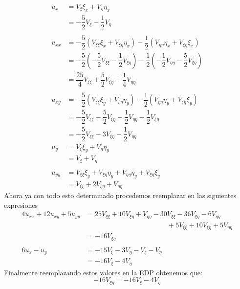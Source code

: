 \begin{homeworkProblem}
\begin{itemize}
\begin{solucion}
\begin{align*}
                 u_x&=V_\xi \xi_x+V_\eta \eta_x\\
                &=-\dfrac{5}{2}V_\xi-\dfrac{1}{2}V_\eta\\
                \\
                u_{xx}&=-\dfrac{5}{2}(V_{\xi\xi}\xi_x+V_{\xi\eta}\eta_x)-\dfrac{1}{2}(V_{\eta\eta}\eta_x+V_{\xi\eta}\xi_x)\\
                &=-\dfrac{5}{2}(-\dfrac{5}{2}V_{\xi\xi}-\dfrac{1}{2}V_{\xi\eta})-\dfrac{1}{2}(-\dfrac{1}{2}V_{\eta\eta}-\dfrac{5}{2}V_{\xi\eta})\\
                &=\dfrac{25}{4}V_{\xi\xi}+\dfrac{5}{2}V_{\xi\eta}+\dfrac{1}{4}V_{\eta\eta}\\
                \\
                u_{xy}&=-\dfrac{5}{2}(V_{\xi\xi}\xi_y+V_{\xi\eta}\eta_y)-\dfrac{1}{2}(V_{\eta\eta}\eta_y+V_{\xi\eta}\xi_y)\\
                &=-\dfrac{5}{2}V_{\xi\xi}-\dfrac{5}{2}V_{\xi\eta}-\dfrac{1}{2}V_{\eta\eta}-\dfrac{1}{2}V_{\xi\eta}\\
                &=-\dfrac{5}{2}V_{\xi\xi}-3V_{\xi\eta}-\dfrac{1}{2}V_{\eta\eta}
                \\
                u_y&=V_\xi \xi_y+V_\eta \eta_y\\
                 &=V_\xi+V_\eta\\
                 \\
                u_{yy}&=V_{\xi\xi}\xi_y+V_{\xi\eta}\eta_y+V_{\eta\eta}\eta_y+V_{\xi\eta}\xi_y\\
                &=V_{\xi\xi}+2V_{\xi\eta}+V_{\eta\eta}
             \end{align*}
             Ahora ya con todo esto determinado procedemos reemplazar en las siguientes expresiones
             \begin{align*}
             4u_{xx}+12u_{xy}+5u_{yy}&=25V_{\xi\xi}+10V_{\xi\eta}+V_{\eta\eta}-30V_{\xi\xi}-36V_{\xi\eta}-6V_{\eta\eta}\\&\hspace{5cm}+5V_{\xi\xi}+10V_{\xi\eta}+5V_{\eta\eta} \\
             &=-16V_{\xi\eta}\\
             \\
             6u_x-u_y&=-15V_\xi-3V_\eta-V_\xi-V_\eta\\
             &=-16V_\xi-4V_\eta
             \end{align*}
             Finalmente reemplazando estos valores en la EDP obtenemos que:
             $$-16V_{\xi\eta}=-16V_\xi-4V_\eta$$

\end{solucion}
\end{itemize}
\end{homeworkProblem}

